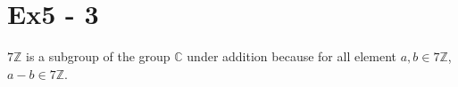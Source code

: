\section*{Ex5 - 3}

$ 7\mathbb{Z} $ is a subgroup of the group $ \mathbb{C} $ under addition because for all element $ a,b \in 7\mathbb{Z} $, $ a - b \in 7\mathbb{Z} $.